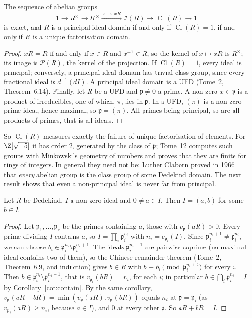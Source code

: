 \begin{proposition}\label{prop:classseq}
The sequence of abelian groups
\[
1\longrightarrow R^\times\longrightarrow K^\times\xrightarrow{\ x\,\mapsto\, xR\ }\mathcal I(R)\longrightarrow\operatorname{Cl}(R)\longrightarrow1
\]
is exact, and $R$ is a principal ideal domain if and only if $\operatorname{Cl}(R)=1$, if and only if $R$ is a unique factorisation domain.
\end{proposition}

\begin{proof}
$xR=R$ if and only if $x\in R$ and $x^{-1}\in R$, so the kernel of $x\mapsto xR$ is $R^\times$; its image is $\mathcal P(R)$, the kernel of the projection. If $\operatorname{Cl}(R)=1$, every ideal is principal; conversely, a principal ideal domain
has trivial class group, since every fractional ideal is $d^{-1}(dI)$. A principal ideal domain is a UFD (Tome~2, Theorem~6.14). Finally, let $R$ be a UFD and $\mathfrak p\ne0$ a prime. A non-zero $x\in\mathfrak p$ is a product of
irreducibles, one of which, $\pi$, lies in $\mathfrak p$. In a UFD, $(\pi)$ is a non-zero prime ideal, hence maximal, so $\mathfrak p=(\pi)$. All primes being principal, so are all products of primes, that is all ideals.
\end{proof}

So $\operatorname{Cl}(R)$ measures exactly the failure of unique factorisation of elements. For $\Z[\sqrt{-5}]$ it has order $2$, generated by the class of $\mathfrak p$; Tome~12 computes such groups with Minkowski's geometry of
numbers and proves that they are finite for rings of integers. In general they need not be: Luther Claborn proved in 1966 that \emph{every} abelian group is the class group of some Dedekind domain. The next result shows that
even a non-principal ideal is never far from principal.

\begin{proposition}\label{prop:twogen}
Let $R$ be Dedekind, $I$ a non-zero ideal and $0\ne a\in I$. Then $I=(a,b)$ for some $b\in I$.
\end{proposition}

\begin{proof}
Let $\mathfrak p_1,\dots,\mathfrak p_r$ be the primes containing $a$, those with $v_{\mathfrak p}(aR)>0$. Every prime dividing $I$ contains $a$, so $I=\prod_i\mathfrak p_i^{n_i}$ with $n_i=v_{\mathfrak p_i}(I)$. Since $\mathfrak p_i^{n_i+1}\ne\mathfrak p_i^{n_i}$, we
can choose $b_i\in\mathfrak p_i^{n_i}\setminus\mathfrak p_i^{n_i+1}$. The ideals $\mathfrak p_i^{n_i+1}$ are pairwise coprime (no maximal ideal contains two of them), so the Chinese remainder theorem (Tome~2, Theorem~6.9, and induction) gives
$b\in R$ with $b\equiv b_i\pmod{\mathfrak p_i^{n_i+1}}$ for every $i$. Then $b\in\mathfrak p_i^{n_i}\setminus\mathfrak p_i^{n_i+1}$, that is $v_{\mathfrak p_i}(bR)=n_i$, for each $i$; in particular $b\in\bigcap_i\mathfrak p_i^{n_i}=I$ by
Corollary~\ref{cor:contain}. By the same corollary, $v_{\mathfrak p}(aR+bR)=\min(v_{\mathfrak p}(aR),v_{\mathfrak p}(bR))$ equals $n_i$ at $\mathfrak p=\mathfrak p_i$ (as $v_{\mathfrak p_i}(aR)\ge n_i$, because $a\in I$), and $0$ at every other $\mathfrak p$. So
$aR+bR=I$.
\end{proof}


